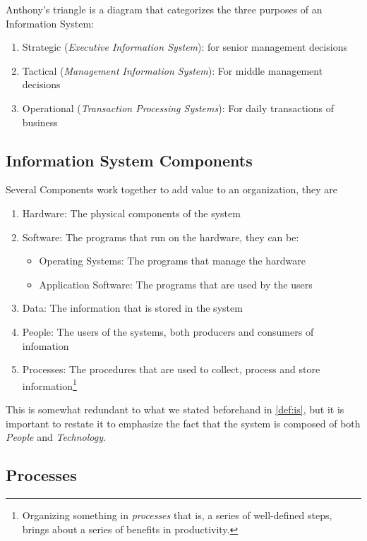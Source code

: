 \documentclass[openright, twoside, twocolumn]{report}
\begin{document}
    Anthony's triangle is a diagram that categorizes the three purposes of an Information System:

    \begin{enumerate}
      \item Strategic (\emph{Executive Information System}): for senior management decisions 
      \item Tactical (\emph{Management Information System}): For middle management decisions
      \item Operational (\emph{Transaction Processing Systems}): For daily transactions of business
    \end{enumerate}

    \subsection{Information System Components} 
    Several Components work together to add value to an organization, they are 

    \begin{enumerate}
      \item Hardware: The physical components of the system
      \item Software: The programs that run on the hardware, they can be:
      \begin{itemize}
        \item Operating Systems: The programs that manage the hardware
        \item Application Software: The programs that are used by the users
      \end{itemize}
      \item Data: The information that is stored in the system
      \item People: The users of the systems, both producers and consumers of infomation
      \item Processes: The procedures that are used to collect, process and store information\footnote{%
        Organizing something in \emph{processes} that is, a series of well-defined steps, brings about a series of 
        benefits in productivity.
      }
    \end{enumerate}

    This is somewhat redundant to what we stated beforehand in \cref{def:is}, but it is important to restate it to 
    emphasize the fact that the system is composed of both \emph{People} and \emph{Technology}.

    \subsection{Processes}
    
\end{document}

